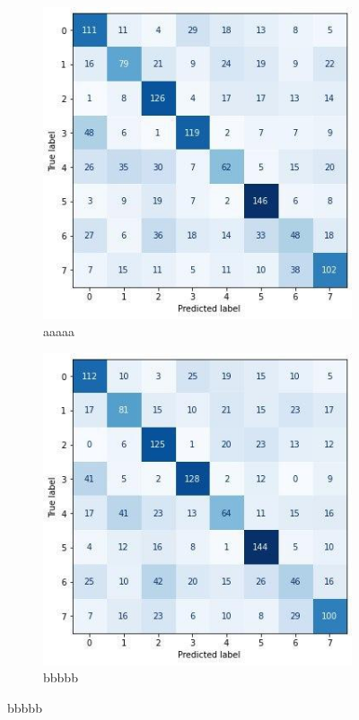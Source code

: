 \begin{figure}
    \begin{subfigure}[c]{0.475\textwidth}
        \centering
        \includegraphics[width=\textwidth]{images/best_vgg16_svmrbf.jpg}
        \caption{aaaaa}
        \label{fig:best_vgg16_svmrbf_cm}
    \end{subfigure}
    \hfill
    \begin{subfigure}[c]{0.475\textwidth}
        \centering
        \includegraphics[width=\textwidth]{images/best_resnet50_svmrbf.jpg}
        \caption{bbbbb}
        \label{fig:best_resnet50_svmrbf_cm}
    \end{subfigure}
\end{figure}

